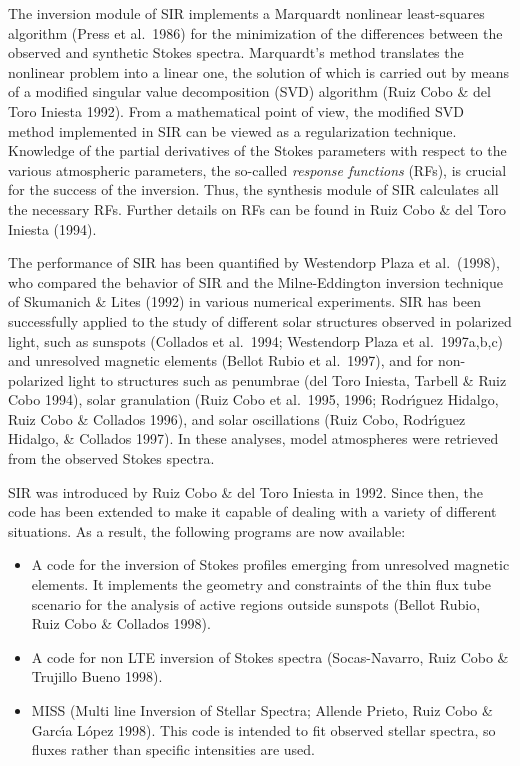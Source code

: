 The inversion module of SIR implements a Marquardt nonlinear
least-squares algorithm (Press et al.\ 1986) for the minimization of
the differences between the observed and synthetic Stokes spectra.
Marquardt's method translates the nonlinear problem into a linear one, 
the solution of which is carried out by means of a modified singular 
value decomposition (SVD) algorithm (Ruiz Cobo \& del Toro
Iniesta 1992). From a mathematical point of view, the modified SVD
method implemented in SIR can be viewed as a regularization technique.
Knowledge of the partial derivatives of the Stokes parameters with
respect to the various atmospheric parameters, the so-called {\em
response functions} (RFs), is crucial for the success of the 
inversion. Thus, the synthesis module of SIR calculates all the
necessary RFs. Further details on RFs can be found in Ruiz 
Cobo \& del Toro Iniesta (1994).

The performance of SIR has been quantified by Westendorp Plaza et
al.\ (1998), who compared the behavior of SIR and the Milne-Eddington
inversion technique of Skumanich \& Lites (1992) in various numerical
experiments. SIR has been successfully applied to the study of
different solar structures observed in polarized light, such as
sunspots (Collados et al.\ 1994; Westendorp Plaza et al.\ 1997a,b,c)
and unresolved magnetic elements (Bellot Rubio et al.\ 1997), and for
non-polarized light to structures such as penumbrae (del Toro Iniesta,
Tarbell \& Ruiz Cobo 1994), solar granulation (Ruiz Cobo et al.\  1995,
1996; Rodr\'{\i}guez Hidalgo, Ruiz Cobo \& Collados 1996), and solar
oscillations (Ruiz Cobo, Rodr\'{\i}guez Hidalgo, \& Collados 1997). In
these analyses, model atmospheres were retrieved from the observed
Stokes spectra.

SIR was introduced by Ruiz Cobo \& del Toro Iniesta in 1992. Since
then, the code has been extended to make it capable of dealing with a
variety of different situations. As a result, the following programs
are now available:
\begin{itemize}
\item A code for the inversion of Stokes profiles emerging from unresolved
magnetic elements. It implements the geometry and constraints of the thin 
flux tube scenario for the analysis of active regions outside sunspots 
(Bellot Rubio, Ruiz Cobo \& Collados 1998). 
\item A code for non LTE inversion of Stokes spectra (Socas-Navarro, 
Ruiz Cobo \& Trujillo Bueno 1998).
\item MISS (Multi line Inversion of Stellar Spectra; Allende Prieto, 
Ruiz Cobo \& Garc\'{\i}a L\'opez 1998). This code is intended to fit 
observed stellar spectra, so fluxes rather than specific intensities 
are used.  
\end{itemize} 

